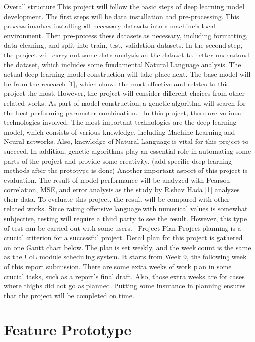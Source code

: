 \documentclass[12pt, natbib=false]{article}
\begin{document}
Overall structure
This project will follow the basic steps of deep learning model development. The first steps will be data installation and pre-processing. This process involves installing all necessary datasets into a machine’s local environment. Then pre-process these datasets as necessary, including formatting, data cleaning, and split into train, test, validation datasets. In the second step, the project will carry out some data analysis on the dataset to better understand the dataset, which includes some fundamental Natural Language analysis. The actual deep learning model construction will take place next. The base model will be from the research [1], which shows the most effective and relates to this project the most. However, the project will consider different choices from other related works. As part of model construction, a genetic algorithm will search for the best-performing parameter combination. 
In this project, there are various technologies involved. The most important technologies are the deep learning model, which consists of various knowledge, including Machine Learning and Neural networks. Also, knowledge of Natural Language is vital for this project to succeed. In addition, genetic algorithms play an essential role in automating some parts of the project and provide some creativity. (add specific deep learning methods after the prototype is done)
Another important aspect of this project is evaluation. The result of model performance will be analyzed with Pearson correlation, MSE, and error analysis as the study by Rishav Hada [1] analyzes their data. To evaluate this project, the result will be compared with other related works. Since rating offensive language with numerical values is somewhat subjective, testing will require a third party to see the result. However, this type of test can be carried out with some users. 
Project Plan
Project planning is a crucial criterion for a successful project. Detail plan for this project is gathered on one Gantt chart below. The plan is set weekly, and the week count is the same as the UoL module scheduling system. It starts from Week 9, the following week of this report submission. There are some extra weeks of work plan in some crucial tasks, such as a report's final draft. Also, those extra weeks are for cases where thighs did not go as planned. Putting some insurance in planning ensures that the project will be completed on time. 


\section{Feature Prototype}
\end{document}
